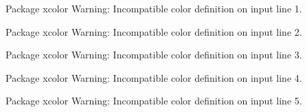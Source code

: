 
Package xcolor Warning: Incompatible color definition on input line 1.


Package xcolor Warning: Incompatible color definition on input line 2.


Package xcolor Warning: Incompatible color definition on input line 3.


Package xcolor Warning: Incompatible color definition on input line 4.


Package xcolor Warning: Incompatible color definition on input line 5.

